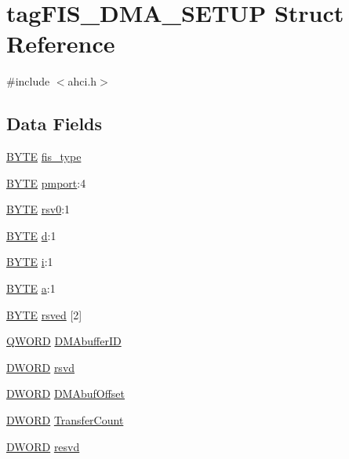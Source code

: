 \hypertarget{structtagFIS__DMA__SETUP}{}\section{tag\+F\+I\+S\+\_\+\+D\+M\+A\+\_\+\+S\+E\+T\+UP Struct Reference}
\label{structtagFIS__DMA__SETUP}


{\ttfamily \#include $<$ahci.\+h$>$}

\subsection*{Data Fields}
\begin{DoxyCompactItemize}
\item 
\hyperlink{ahci_8h_aae9749d96e15ccb4f482dd5f55d98f9b}{B\+Y\+TE} \hyperlink{structtagFIS__DMA__SETUP_abefd5347cafc45bdb5809e5a19dd9c1a}{fis\+\_\+type}
\item 
\hyperlink{ahci_8h_aae9749d96e15ccb4f482dd5f55d98f9b}{B\+Y\+TE} \hyperlink{structtagFIS__DMA__SETUP_a16105ba91da7e8f786aab034f80628ee}{pmport}\+:4
\item 
\hyperlink{ahci_8h_aae9749d96e15ccb4f482dd5f55d98f9b}{B\+Y\+TE} \hyperlink{structtagFIS__DMA__SETUP_aad9c70d773cc656ecd07267c7a86bdd5}{rsv0}\+:1
\item 
\hyperlink{ahci_8h_aae9749d96e15ccb4f482dd5f55d98f9b}{B\+Y\+TE} \hyperlink{structtagFIS__DMA__SETUP_ac2757369abeaffe2c5cc0ce30db3ce89}{d}\+:1
\item 
\hyperlink{ahci_8h_aae9749d96e15ccb4f482dd5f55d98f9b}{B\+Y\+TE} \hyperlink{structtagFIS__DMA__SETUP_aebe230b1fe0fb8afdc82ef964de0792e}{i}\+:1
\item 
\hyperlink{ahci_8h_aae9749d96e15ccb4f482dd5f55d98f9b}{B\+Y\+TE} \hyperlink{structtagFIS__DMA__SETUP_ae029fb312376fa0aba35b4a0b4ac8e29}{a}\+:1
\item 
\hyperlink{ahci_8h_aae9749d96e15ccb4f482dd5f55d98f9b}{B\+Y\+TE} \hyperlink{structtagFIS__DMA__SETUP_acd0f922e38db3f3fc24d206bd7ce9c68}{rsved} \mbox{[}2\mbox{]}
\item 
\hyperlink{ahci_8h_aca6f268a6a107bbd356a13da7e03befd}{Q\+W\+O\+RD} \hyperlink{structtagFIS__DMA__SETUP_a2ec10ff5b229801bd13d829c5d7abf5a}{D\+M\+Abuffer\+ID}
\item 
\hyperlink{ahci_8h_af483253b2143078cede883fc3c111ad2}{D\+W\+O\+RD} \hyperlink{structtagFIS__DMA__SETUP_a655559568a515a7148f52086e16d9665}{rsvd}
\item 
\hyperlink{ahci_8h_af483253b2143078cede883fc3c111ad2}{D\+W\+O\+RD} \hyperlink{structtagFIS__DMA__SETUP_ade6c38f383cecf7d39aef0b3da265696}{D\+M\+Abuf\+Offset}
\item 
\hyperlink{ahci_8h_af483253b2143078cede883fc3c111ad2}{D\+W\+O\+RD} \hyperlink{structtagFIS__DMA__SETUP_abcd17669839d8c45ff2a2da1e881fd97}{Transfer\+Count}
\item 
\hyperlink{ahci_8h_af483253b2143078cede883fc3c111ad2}{D\+W\+O\+RD} \hyperlink{structtagFIS__DMA__SETUP_a366a2b6c766792a357e31e2e2e713447}{resvd}
\end{DoxyCompactItemize}


